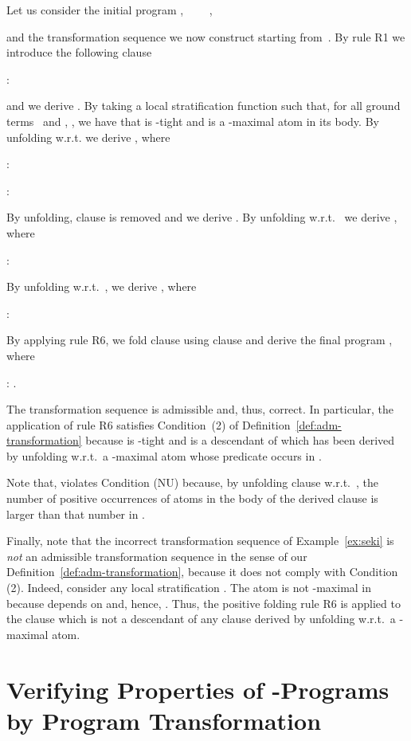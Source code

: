 \documentclass[english]{tlp}
\begin{document}
\begin{example}\label{ex:not_seki}\nopagebreak 
Let us consider the initial program  , \ \ 
\ \ 
, \ \ 

and the transformation sequence we now construct starting from~.
By rule R1 we introduce the following clause

: 

\noindent and we derive . 
By taking a local stratification function  such that, 
for all ground terms~ and , , we have that  is \mbox{-tight} and
 is a \mbox{-maximal} atom in its body.
By unfolding  w.r.t.  we derive 
,
where

: \hspace{2cm}

: 

\noindent
By unfolding, clause  is removed and we derive
. By unfolding 
w.r.t.~ we derive , where

: 

\noindent
By unfolding
 w.r.t.~, we derive , where

: 

\noindent
By applying rule R6, we fold clause  using
clause  and derive the final program , where

: .

\noindent The transformation
sequence  is admissible and, thus, correct. In particular, the
application of rule R6 satisfies Condition~(2) of
Definition~\ref{def:adm-transformation} because  is -tight
and 
is a descendant of  which has been derived by unfolding 
w.r.t.~a -maximal atom whose predicate occurs in . 

Note that,  violates Condition (NU) 
because, by unfolding clause  
w.r.t.~,
the number of positive occurrences of atoms in
the body of the derived clause  is larger
than that number in .
\end{example}

Finally, note that the incorrect transformation sequence of
Example~\ref{ex:seki} is {\it{not}} an admissible transformation
sequence in the sense of our
Definition~\ref{def:adm-transformation}, because it does not comply
with Condition (2). Indeed, consider any local stratification .
The atom  is not -maximal in  because  depends  on  and, hence,
. Thus, the positive folding rule R6 is
applied to the clause  which is not a descendant of any
clause derived by unfolding w.r.t.~a -maximal atom.

\section{Verifying Properties of -Programs by
Program Transformation}
\label{sec:verification}
\end{document}
